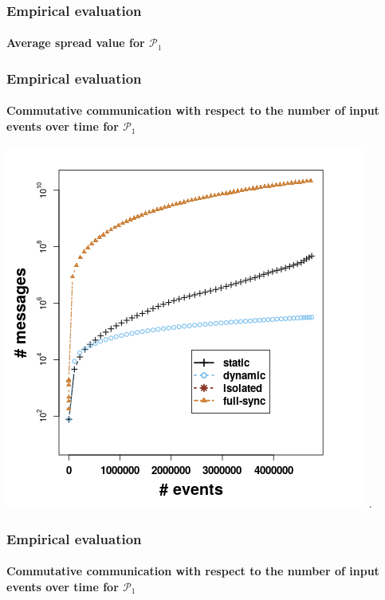 \begin{frame}
	
	\frametitle{Empirical evaluation }
	\framesubtitle{Average spread value for $\mathcal{P}_1$}
	

	
\end{frame}




\begin{frame}
	
	\frametitle{Empirical evaluation }
	\framesubtitle{Commutative communication with respect to the number of input events over time for $\mathcal{P}_1$}
	
	\begin{center}
		\includegraphics[width=.8\textwidth,height=.7\linewidth]{figures/messages_p1.png}
		.
	\end{center}
	
\end{frame}

\begin{frame}
	
	\frametitle{Empirical evaluation }
	\framesubtitle{Commutative communication with respect to the number of input events over time for $\mathcal{P}_1$}
	
	
	
\end{frame}



